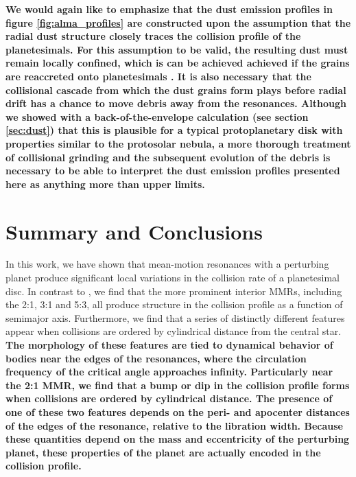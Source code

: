 \documentclass[fleqn,usenatbib]{mnras}
\begin{document}
\textbf{We would again like to emphasize that the dust emission profiles in figure \ref{fig:alma_profiles} are constructed upon the assumption that the radial dust structure closely traces the 
collision profile of the planetesimals. For this assumption to be valid, the resulting dust must remain locally confined, which is can be achieved achieved if the grains are reaccreted onto 
planetesimals \citep{2015SciA....1E0109J}. It is also necessary that the collisional cascade from which the dust grains form plays before radial drift has a chance to move debris away 
from the resonances. Although we showed with a back-of-the-envelope calculation (see section \ref{sec:dust}) that this is plausible for a typical protoplanetary disk with properties similar 
to the protosolar nebula, a more thorough treatment of collisional grinding and the subsequent evolution of the debris is necessary to be able to interpret the dust emission profiles 
presented here as anything more than upper limits.}

\section{Summary and Conclusions}\label{sec:conclusions}

In this work, we have shown that mean-motion resonances with a perturbing planet produce significant local variations in the collision rate of a 
planetesimal disc. In contrast to \citet{2000Icar..143...45R}, we find that the more prominent interior MMRs, including the 2:1, 3:1 and 5:3, all 
produce structure in the collision profile as a function of semimajor axis. Furthermore, we find that a series of distinctly different features appear 
when collisions are ordered by cylindrical distance from the central star. \textbf{The morphology of these features are tied to dynamical behavior of bodies near the edges of the 
resonances, where the circulation frequency of the critical angle approaches infinity. Particularly near the 2:1 MMR, we find that a bump or dip in the collision profile forms when collisions 
are ordered by cylindrical distance. The presence of one of these two features depends on the peri- and apocenter distances of the edges of the resonance, relative to the libration width. 
Because these quantities depend on the mass and eccentricity of the perturbing planet, these properties of the planet are actually encoded in the collision profile.}
\end{document}
